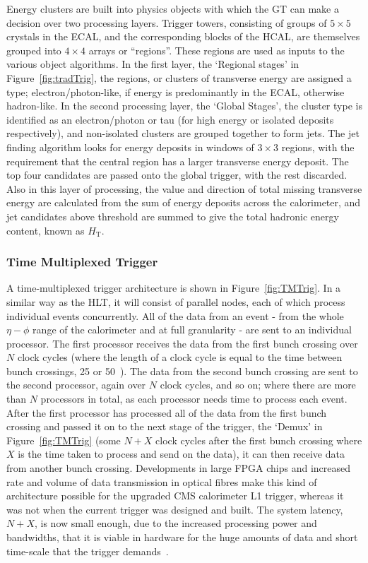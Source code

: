 Energy clusters are built into physics objects with which the \ac{GT} can make a decision over two processing layers. 
Trigger towers, consisting of groups of $5 \times 5$ crystals in the \ac{ECAL}, and the corresponding blocks of the \ac{HCAL}, are themselves grouped into $4 \times 4$ arrays or ``regions''. 
These regions are used as inputs to the various object algorithms.
In the first layer, the `Regional stages' in Figure~\ref{fig:tradTrig}, the regions, or clusters of transverse energy are assigned a type; electron/photon-like, if energy is predominantly in the \ac{ECAL}, otherwise hadron-like.
In the second processing layer, the `Global Stages', the cluster type is identified as an electron/photon or tau (for high energy or isolated deposits respectively), and non-isolated clusters are grouped together to form jets.
The jet finding algorithm looks for energy deposits in windows of $3 \times 3$ regions, with the requirement that the central region has a larger transverse energy deposit. 
The top four candidates are passed onto the global trigger, with the rest discarded.
Also in this layer of processing, the value and direction of total missing transverse energy are calculated from the sum of energy deposits across the calorimeter, 
and jet candidates above threshold are summed to give the total hadronic energy content, known as $H_{\mathrm{T}}$.    




\subsubsection{Time Multiplexed Trigger}
A time-multiplexed trigger architecture is shown in Figure~\ref{fig:TMTrig}. 
In a similar way as the \ac{HLT}, it will consist of parallel nodes, each of which process individual events concurrently.
All of the data from an event - from the whole $\eta - \phi$ range of the calorimeter and at full granularity - are sent to an individual processor. 
The first processor receives the data from the first bunch crossing over $N$ clock cycles (where the length of a clock cycle is equal to the time between bunch crossings, 25 or 50~\ns).
The data from the second bunch crossing are sent to the second processor, again over $N$ clock cycles, and so on; where there are more than $N$ processors in total, as each processor needs time to process each event.
After the first processor has processed all of the data from the first bunch crossing and passed it on to the next stage of the trigger, the `Demux' in Figure~\ref{fig:TMTrig} (some $N+X$ clock cycles after the first bunch crossing where $X$ is the time taken to process and send on the data), it can then receive data from another bunch crossing.
Developments in large \ac{FPGA} chips and increased rate and volume of data transmission in optical fibres make this kind of architecture possible for the upgraded CMS calorimeter L1 trigger, whereas it was not when the current trigger was designed and built. 
The system latency, $N+X$, is now small enough, due to the increased processing power and bandwidths, that it is viable in hardware for the huge amounts of data and short time-scale that the trigger demands~\cite{TMT_dem}. 

